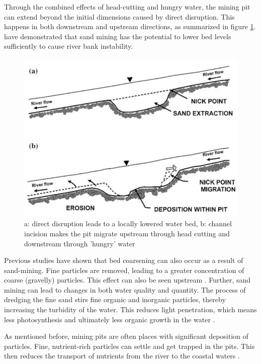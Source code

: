 Through the combined effects of head-cutting and hungry water, the mining pit can extend beyond the initial dimensions caused by direct disruption. This happens in both downstream and upstream directions, as summarized in figure \ref{fig:channelbedeffects}. \textcite{hackneyRiverBankInstability2020} have demonstrated that sand mining has the potential to lower bed levels sufficiently to
cause river bank instability.

\begin{figure}[H]
    \centering
    \includegraphics[width=0.75\linewidth]{figures/channelbedeffects.png}
    \caption{a: direct disruption leads to a locally lowered water bed, b: channel incision makes the pit migrate upstream through head cutting and downstream through 'hungry' water \autocite{sand-mining-boek}}
    \label{fig:channelbedeffects}
\end{figure}

Previous studies have shown that bed coarsening can also occur as a result of sand-mining. Fine particles are removed, leading to a greater concentration of coarse (gravelly) particles. This effect can also be seen upstream \autocite{sand-mining-boek}. Further, sand mining can lead to changes in both water quality and quantity. The process of dredging the fine sand stirs fine organic and inorganic particles, thereby increasing the turbidity of the water. This reduces light penetration, which means less photosynthesis and ultimately less organic growth in the water \autocite{sharipEffectsSeasonSand2014}.

As mentioned before, mining pits are often places with significant deposition of particles. Fine, nutrient-rich particles can settle and get trapped in the pits. This then reduces the transport of nutrients from the river to the coastal waters \autocite{sand-mining-boek}.

